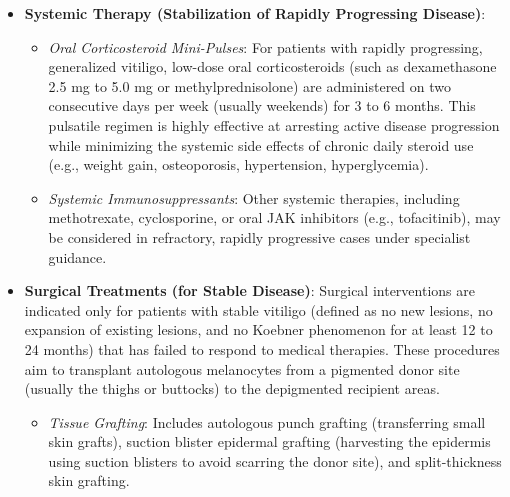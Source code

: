 \begin{itemize}
\begin{itemize}
        \item \textit{Targeted Phototherapy (Excimer Laser/Lamp)}: The 308 nm excimer laser or monochromatic excimer lamp delivers intense, targeted UVB radiation to localized vitiligo patches, sparing surrounding unaffected skin from hyperpigmentation and UV exposure. It is highly effective for localized lesions on the face and neck.
        \item \textit{Psoralen plus Ultraviolet A (PUVA)}: Involves the administration of a photosensitizing agent (psoralen, either orally or topically as a bath/cream) followed by exposure to UVA light. While effective, PUVA has largely been replaced by NB-UVB due to its higher risk of phototoxic reactions, nausea, headache, and long-term risk of non-melanoma skin cancers.
    \end{itemize}
    \item \textbf{Systemic Therapy (Stabilization of Rapidly Progressing Disease)}:
    \begin{itemize}
        \item \textit{Oral Corticosteroid Mini-Pulses}: For patients with rapidly progressing, generalized vitiligo, low-dose oral corticosteroids (such as dexamethasone 2.5 mg to 5.0 mg or methylprednisolone) are administered on two consecutive days per week (usually weekends) for 3 to 6 months. This pulsatile regimen is highly effective at arresting active disease progression while minimizing the systemic side effects of chronic daily steroid use (e.g., weight gain, osteoporosis, hypertension, hyperglycemia).
        \item \textit{Systemic Immunosuppressants}: Other systemic therapies, including methotrexate, cyclosporine, or oral JAK inhibitors (e.g., tofacitinib), may be considered in refractory, rapidly progressive cases under specialist guidance.
    \end{itemize}
    \item \textbf{Surgical Treatments (for Stable Disease)}:
    Surgical interventions are indicated only for patients with stable vitiligo (defined as no new lesions, no expansion of existing lesions, and no Koebner phenomenon for at least 12 to 24 months) that has failed to respond to medical therapies. These procedures aim to transplant autologous melanocytes from a pigmented donor site (usually the thighs or buttocks) to the depigmented recipient areas.
    \begin{itemize}
        \item \textit{Tissue Grafting}: Includes autologous punch grafting (transferring small skin grafts), suction blister epidermal grafting (harvesting the epidermis using suction blisters to avoid scarring the donor site), and split-thickness skin grafting.

\end{itemize}
\end{itemize}
